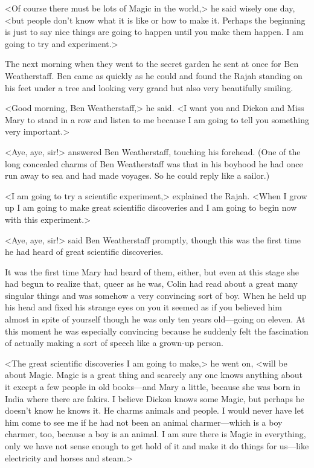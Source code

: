 <Of course there must be lots of Magic in the world,> he said wisely one day, <but people don't know what it is like or how to make it. Perhaps the beginning is just to say nice things are going to happen until you make them happen. I am going to try and experiment.>

The next morning when they went to the secret garden he sent at once for Ben Weatherstaff. Ben came as quickly as he could and found the Rajah standing on his feet under a tree and looking very grand but also very beautifully smiling.

<Good morning, Ben Weatherstaff,> he said. <I want you and Dickon and Miss Mary to stand in a row and listen to me because I am going to tell you something very important.>

<Aye, aye, sir!> answered Ben Weatherstaff, touching his forehead. (One of the long concealed charms of Ben Weatherstaff was that in his boyhood he had once run away to sea and had made voyages. So he could reply like a sailor.)

<I am going to try a scientific experiment,> explained the Rajah. <When I grow up I am going to make great scientific discoveries and I am going to begin now with this experiment.>

<Aye, aye, sir!> said Ben Weatherstaff promptly, though this was the first time he had heard of great scientific discoveries.

It was the first time Mary had heard of them, either, but even at this stage she had begun to realize that, queer as he was, Colin had read about a great many singular things and was somehow a very convincing sort of boy. When he held up his head and fixed his strange eyes on you it seemed as if you believed him almost in spite of yourself though he was only ten years old—going on eleven. At this moment he was especially convincing because he suddenly felt the fascination of actually making a sort of speech like a grown-up person.

<The great scientific discoveries I am going to make,> he went on, <will be about Magic. Magic is a great thing and scarcely any one knows anything about it except a few people in old books—and Mary a little, because she was born in India where there are fakirs. I believe Dickon knows some Magic, but perhaps he doesn't know he knows it. He charms animals and people. I would never have let him come to see me if he had not been an animal charmer—which is a boy charmer, too, because a boy is an animal. I am sure there is Magic in everything, only we have not sense enough to get hold of it and make it do things for us—like electricity and horses and steam.>

